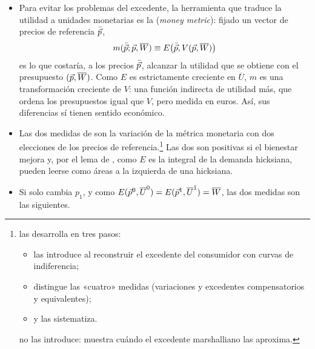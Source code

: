 \documentclass[11pt]{article}
\begin{document}
\begin{itemize}
\item Para evitar los problemas del excedente, la herramienta que traduce la utilidad a unidades monetarias es la  (\emph{money metric})\nocite{McKenzie1957Demand,Samuelson1974Complementarity,MasColellWhinstonGreen1995}: fijado un vector de precios de referencia $\bar{\vec{p}}$,
  \begin{equation}
  m(\bar{\vec{p}};\vec{p},\overline{W})\equiv E\big(\bar{\vec{p}},V(\vec{p},\overline{W})\big) \label{eq:money-metric}
  \end{equation}
  es lo que costaría, a los precios $\bar{\vec{p}}$, alcanzar la utilidad que se obtiene con el presupuesto $(\vec{p},\overline{W})$. Como $E$ es estrictamente creciente en $\overline{U}$, $m$ es una transformación creciente de $V$: una función indirecta de utilidad más, que ordena los presupuestos igual que $V$, pero medida en euros. Así, sus diferencias sí tienen sentido económico.
\item Las dos medidas de  son la variación de la métrica monetaria con dos elecciones de los precios de referencia.\footnote{ las desarrolla en tres pasos:
\begin{itemize}
\item \textcite{Hicks1939Value,Hicks1941Rehabilitation} las introduce al reconstruir el excedente del consumidor con curvas de indiferencia;
\item \textcite{Hicks1943Four} distingue las «cuatro» medidas (variaciones y excedentes compensatorios y equivalentes);
\item y \textcite{Hicks1956Revision} las sistematiza.
\end{itemize}
\textcite{Willig1976Surplus} no las introduce: muestra cuándo el excedente marshalliano las aproxima.} Las dos son positivas si el bienestar mejora y, por el lema de , como $E$ es la integral de la demanda hicksiana, pueden leerse como áreas a la izquierda de una hicksiana.
\item Si solo cambia $p_1$, y como $E(\vec{p}^0,\overline{U}^0)=E(\vec{p}^1,\overline{U}^1)=\overline{W}$, las dos medidas son las siguientes.
\end{itemize}
\end{document}
